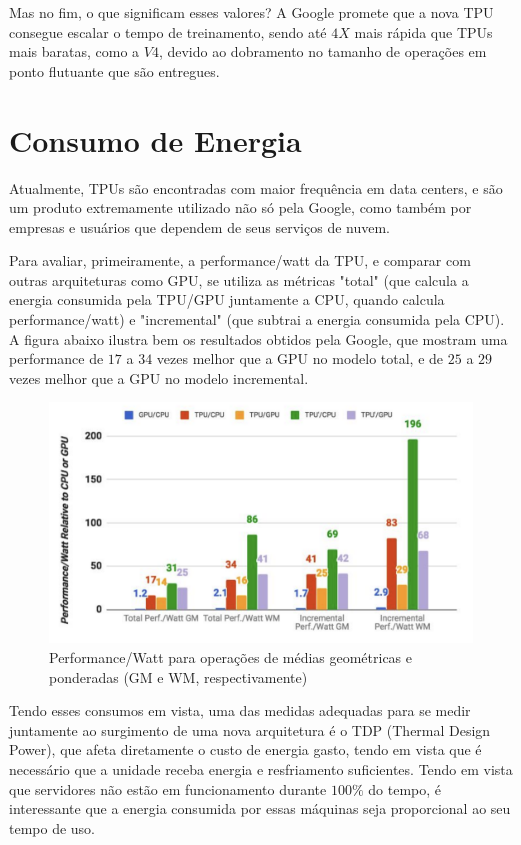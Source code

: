 \documentclass{report}
\begin{document}
Mas no fim, o que significam esses valores? A Google promete que a nova TPU consegue escalar o tempo de treinamento, sendo até $4X$ mais rápida que TPUs mais baratas, como a $V4$, devido ao dobramento no tamanho de operações em ponto flutuante que são entregues.

\chapter{Consumo de Energia}

Atualmente, TPUs são encontradas com maior frequência em data centers, e são um produto extremamente utilizado não só pela Google, como também por empresas e usuários que dependem de seus serviços de nuvem.

Para avaliar, primeiramente, a performance/watt da TPU, e comparar com outras arquiteturas como GPU, se utiliza as métricas "total" (que calcula a energia consumida pela TPU/GPU juntamente a CPU, quando calcula performance/watt) e "incremental" (que subtrai a energia consumida pela CPU). A figura abaixo ilustra bem os resultados obtidos pela Google, que mostram uma performance de $17$ a $34$ vezes melhor que a GPU no modelo total, e de $25$ a $29$ vezes melhor que a GPU no modelo incremental.

\begin{figure}[h]
	\includegraphics[scale=0.5]{performance-watt}
	\centering
	\caption{Performance/Watt para operações de médias geométricas e ponderadas (GM e WM, respectivamente)}
\end{figure}

Tendo esses consumos em vista, uma das medidas adequadas para se medir juntamente ao surgimento de uma nova arquitetura é o TDP (Thermal Design Power), que afeta diretamente o custo de energia gasto, tendo em vista que é necessário que a unidade receba energia e resfriamento suficientes. Tendo em vista que servidores não estão em funcionamento durante $100\%$ do tempo, é interessante que a energia consumida por essas máquinas seja proporcional ao seu tempo de uso.
\end{document}
